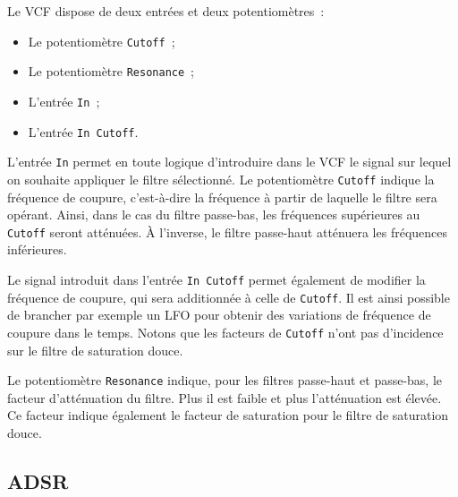 \documentclass[a4paper,oneside,frenchb,10pt]{article}
\begin{document}
Le VCF dispose de deux entrées et deux potentiomètres~:

\begin{itemize}
\item
  Le potentiomètre \verb!Cutoff!~;
\item
  Le potentiomètre \verb!Resonance!~;
\item
  L'entrée \verb!In!~;
\item
  L'entrée \verb!In Cutoff!.
\end{itemize}
L'entrée \verb!In! permet en toute logique d'introduire dans le VCF le
signal sur lequel on souhaite appliquer le filtre sélectionné. Le
potentiomètre \verb!Cutoff! indique la fréquence de coupure,
c'est-à-dire la fréquence à partir de laquelle le filtre sera opérant.
Ainsi, dans le cas du filtre passe-bas, les fréquences supérieures au
\verb!Cutoff! seront atténuées. À l'inverse, le filtre passe-haut
atténuera les fréquences inférieures.

Le signal introduit dans l'entrée \verb!In Cutoff! permet également de
modifier la fréquence de coupure, qui sera additionnée à celle de
\verb!Cutoff!. Il est ainsi possible de brancher par exemple un LFO pour
obtenir des variations de fréquence de coupure dans le temps. Notons
que les facteurs de \verb!Cutoff! n'ont pas d'incidence sur le filtre de
saturation douce.

Le potentiomètre \verb!Resonance! indique, pour les filtres passe-haut
et passe-bas, le facteur d'atténuation du filtre. Plus il est faible et
plus l'atténuation est élevée. Ce facteur indique également le facteur
de saturation pour le filtre de saturation douce.

\subsection{ADSR}
\end{document}
